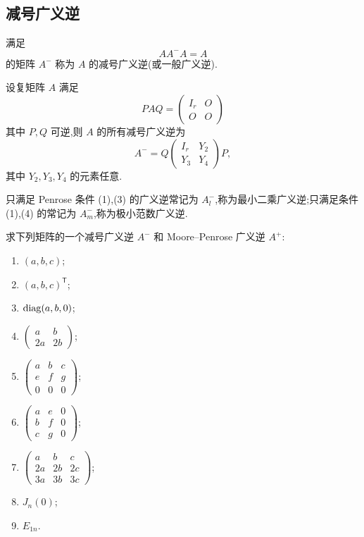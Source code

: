 \subsection{减号广义逆}

\begin{definition}
满足
\[
AA^-A=A
\]
的矩阵 $A^-$ 称为 $A$ 的减号广义逆(或一般广义逆).
\end{definition}

\begin{theorem}[\markstar]
设复矩阵 $A$ 满足
\[
PAQ=
\begin{pmatrix}I_r&O\\O&O\end{pmatrix}
\]
其中 $P,Q$ 可逆,则 $A$ 的所有减号广义逆为
\[
\boxed{
A^-
=Q
\begin{pmatrix}
I_r&Y_2\\
Y_3&Y_4
\end{pmatrix}
P
},
\]
其中 $Y_2,Y_3,Y_4$ 的元素任意.
\end{theorem}

\begin{remark}
只满足 Penrose 条件 (1),(3) 的广义逆常记为 $A_l^-$,称为最小二乘广义逆;只满足条件 (1),(4) 的常记为 $A_m^-$,称为极小范数广义逆.
\end{remark}

\begin{example}
求下列矩阵的一个减号广义逆 $A^-$ 和 Moore--Penrose 广义逆 $A^+$:
\begin{enumerate}
  \item $(a,b,c)$;
  \item $(a,b,c)^{\mathsf T}$;
  \item $\operatorname{diag}(a,b,0)$;
  \item $\begin{pmatrix}a&b\\2a&2b\end{pmatrix}$;
  \item $\begin{pmatrix}a&b&c\\e&f&g\\0&0&0\end{pmatrix}$;
  \item $\begin{pmatrix}a&e&0\\b&f&0\\c&g&0\end{pmatrix}$;
  \item $\begin{pmatrix}a&b&c\\2a&2b&2c\\3a&3b&3c\end{pmatrix}$;
  \item $J_n(0)$;
  \item $E_{1n}$.
\end{enumerate}
\end{example}
\exampleblank

